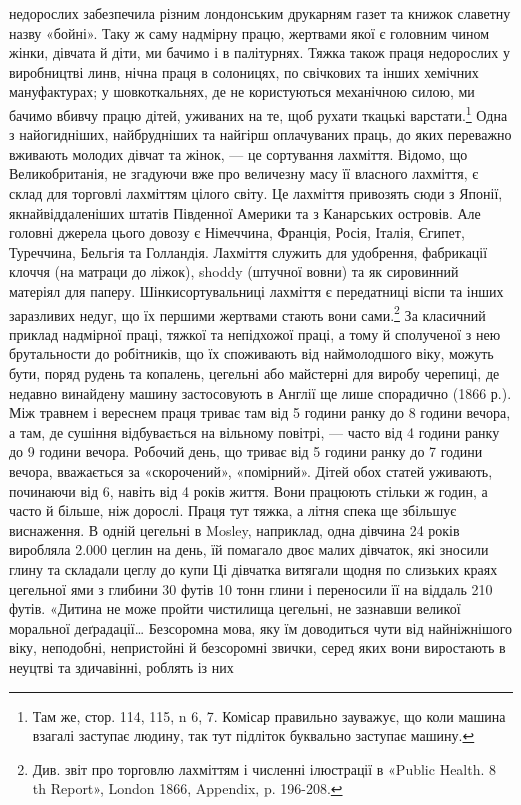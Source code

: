 \parcont{}  %
недорослих забезпечила різним лондонським друкарням газет
та книжок славетну назву «бойні». Таку ж саму надмірну
працю, жертвами якої є головним чином жінки, дівчата й діти,
ми бачимо і в палітурнях. Тяжка також праця недорослих у
виробництві линв, нічна праця в солоницях, по свічкових та інших
хемічних мануфактурах; у шовкоткальнях, де не користуються
механічною силою, ми бачимо вбивчу працю дітей, уживаних на
те, щоб рухати ткацькі варстати.\footnote{
Там же, стор. 114, 115, n 6, 7. Комісар правильно зауважує,
що коли машина взагалі заступає людину, так тут підліток буквально
заступає машину.
} Одна з найогидніших, найбрудніших
та найгірш оплачуваних праць, до яких переважно
вживають молодих дівчат та жінок, — це сортування лахміття.
Відомо, що Великобританія, не згадуючи вже про величезну масу
її власного лахміття, є склад для торговлі лахміттям цілого світу.
Це лахміття привозять сюди з Японії, якнайвіддаленіших штатів
Південної Америки та з Канарських островів. Але головні джерела
цього довозу є Німеччина, Франція, Росія, Італія, Єгипет,
Туреччина, Бельгія та Голландія. Лахміття служить для
удобрення, фабрикації клоччя (на матраци до ліжок), shoddy
(штучної вовни) та як сировинний матеріял для паперу. Шінкисортувальниці
лахміття є передатниці віспи та інших заразливих
недуг, що їх першими жертвами стають вони сами.\footnote{
Див. звіт про торговлю лахміттям і численні ілюстрації в «Public
Health. 8 th Report», London 1866, Appendix, p. 196-208.
} За класичний
приклад надмірної праці, тяжкої та непідхожої праці, а
тому й сполученої з нею брутальности до робітників, що їх споживають
від наймолодшого віку, можуть бути, поряд рудень та
копалень, цегельні або майстерні для виробу черепиці, де недавно
винайдену машину застосовують в Англії ще лише спорадично
(1866 р.). Між травнем і вереснем праця триває там від 5 години
ранку до 8 години вечора, а там, де сушіння відбувається на
вільному повітрі, — часто від 4 години ранку до 9 години вечора.
Робочий день, що триває від 5 години ранку до 7 години вечора,
вважається за «скорочений», «помірний». Дітей обох статей
уживають, починаючи від 6, навіть від 4 років життя. Вони працюють
стільки ж годин, а часто й більше, ніж дорослі. Праця
тут тяжка, а літня спека ще збільшує виснаження. В одній цегельні
в Mosley, наприклад, одна дівчина 24 років виробляла
2.000 цеглин на день, їй помагало двоє малих дівчаток, які зносили
глину та складали цеглу до купи Ці дівчатка витягали
щодня по слизьких краях цегельної ями з глибини 30 футів 10 тонн
глини і переносили її на віддаль 210 футів. «Дитина не може
пройти чистилища цегельні, не зазнавши великої моральної
деґрадації\dots{} Безсоромна мова, яку їм доводиться чути від найніжнішого
віку, неподобні, непристойні й безсоромні звички, серед
яких вони виростають в неуцтві та здичавінні, роблять із них
\parbreak{}  %
